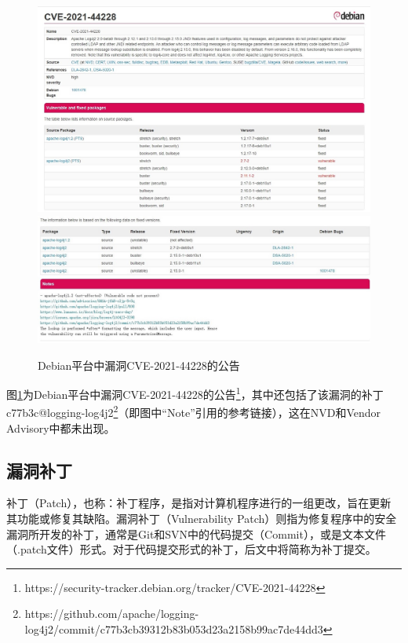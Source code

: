 \begin{figure}[!t]
    \centering
    \includegraphics[width=1.0\textwidth]{fig/debian-2021-44228}
    \includegraphics[width=1.0\textwidth]{fig/debian-2021-44228-2}
    \caption{Debian平台中漏洞CVE-2021-44228的公告}
    \label{fig:debian-2021-44228}
\end{figure}
图\ref{fig:debian-2021-44228}为Debian平台中漏洞CVE-2021-44228的公告\footnote{https://security-tracker.debian.org/tracker/CVE-2021-44228}，其中还包括了该漏洞的补丁c77b3c@logging-log4j2\footnote{https://github.com/apache/logging-log4j2/commit/c77b3cb39312b83b053d23a2158b99ac7de44dd3}（即图中“Note”引用的参考链接），这在NVD和Vendor Advisory中都未出现。


\subsection{漏洞补丁}
补丁（Patch），也称：补丁程序，是指对计算机程序进行的一组更改，旨在更新其功能或修复其缺陷。漏洞补丁（Vulnerability Patch）则指为修复程序中的安全漏洞所开发的补丁，通常是Git和SVN中的代码提交（Commit），或是文本文件（.patch文件）形式。对于代码提交形式的补丁，后文中将简称为补丁提交。

